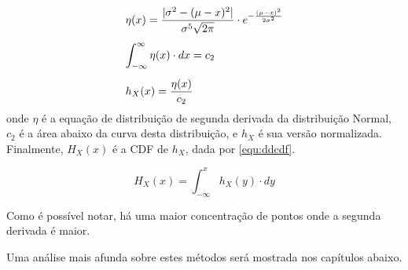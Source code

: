 \begin{equation}
\begin{array}{l}
\vspace{0.3cm}\displaystyle \eta(x) = \frac{|\sigma^2 - (\mu - x)^2|}{ \sigma^5\sqrt{2\pi}}\cdot e^{-\frac{(\mu - x)^2}{2 \sigma^2}} \\
\vspace{0.3cm} \displaystyle \int_{-\infty}^{\infty} \eta(x)\cdot dx = c_2 \\
\displaystyle h_X(x) = \frac{\eta(x)}{c_2}
\label{equ:hx}
\end{array}
\end{equation}
onde $\eta$ é a equação de distribuição de segunda derivada da distribuição Normal, $c_2$ é a área abaixo da curva desta distribuição, e $h_X$ é sua versão normalizada. 
Finalmente, $H_X(x)$ é a \ac{CDF} de $h_X$, dada por \eqref{equ:ddcdf}.

\begin{equation}
H_X(x) = \int_{-\infty}^x h_X(y)\cdot dy
\label{equ:ddcdf}
\end{equation}

Como é possível notar, há uma maior concentração de pontos onde a segunda derivada é maior.


Uma análise mais afunda sobre estes métodos será mostrada nos capítulos abaixo.
